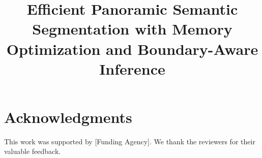 \documentclass[conference]{IEEEtran}
\begin{document}
\title{Efficient Panoramic Semantic Segmentation with Memory Optimization and Boundary-Aware Inference}

\author{
}

\maketitle











\section*{Acknowledgments}
This work was supported by [Funding Agency]. We thank the reviewers for their valuable feedback.



\end{document}
